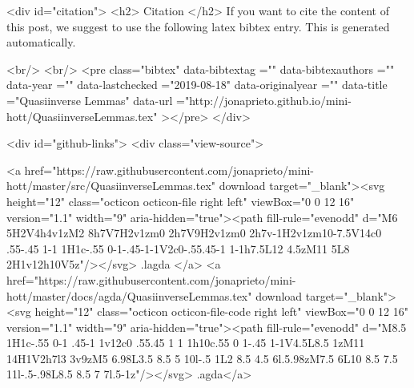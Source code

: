   
  <div id="citation">
  <h2> Citation </h2>
  If you want to cite the content of this post,
  we suggest to use the following latex bibtex entry.
  This is generated automatically.

  <br/>
  <br/>
  <pre class="bibtex"
       data-bibtextag =""
       data-bibtexauthors =""
       data-year =""
       data-lastchecked ="2019-08-18"
       data-originalyear =""
       data-title ="Quasiinverse Lemmas"
       data-url ="http://jonaprieto.github.io/mini-hott/QuasiinverseLemmas.tex"
  ></pre>
  </div>
  

  <div id="github-links">
    <div class="view-source">
      
        <a href="https://raw.githubusercontent.com/jonaprieto/mini-hott/master/src/QuasiinverseLemmas.tex" download target="_blank"><svg height="12" class="octicon octicon-file right left" viewBox="0 0 12 16" version="1.1" width="9" aria-hidden="true"><path fill-rule="evenodd" d="M6 5H2V4h4v1zM2 8h7V7H2v1zm0 2h7V9H2v1zm0 2h7v-1H2v1zm10-7.5V14c0 .55-.45 1-1 1H1c-.55 0-1-.45-1-1V2c0-.55.45-1 1-1h7.5L12 4.5zM11 5L8 2H1v12h10V5z"/></svg> .lagda </a>
        <a href="https://raw.githubusercontent.com/jonaprieto/mini-hott/master/docs/agda/QuasiinverseLemmas.tex" download target="_blank"><svg height="12" class="octicon octicon-file-code right left" viewBox="0 0 12 16" version="1.1" width="9" aria-hidden="true"><path fill-rule="evenodd" d="M8.5 1H1c-.55 0-1 .45-1 1v12c0 .55.45 1 1 1h10c.55 0 1-.45 1-1V4.5L8.5 1zM11 14H1V2h7l3 3v9zM5 6.98L3.5 8.5 5 10l-.5 1L2 8.5 4.5 6l.5.98zM7.5 6L10 8.5 7.5 11l-.5-.98L8.5 8.5 7 7l.5-1z"/></svg> .agda</a>
      
